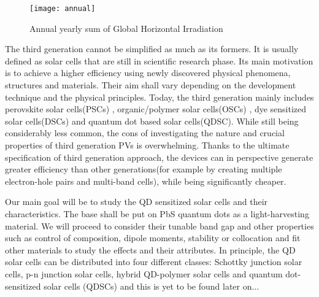 \begin{figure}[h]
\label{fig:annual} 
\centering
\texttt{[image: annual]}
\caption{Annual yearly sum of Global Horizontal Irradiation
\cite{1991-2010}}
\end{figure}

\noindent The third generation cannot be simplified as much as its formers. It is usually defined as solar cells that are still in scientific research phase.  \cite{HuashangRao2018}\cite{GavinCon} Its main motivation is to achieve a higher efficiency using newly discovered physical phenomena, structures and materials. Their aim shall vary depending on the development technique and the physical principles. Today, the third generation mainly includes perovskite solar cells(PSCs) \cite{PerovRev} \cite{revPerold}, organic/polymer solar cells(OSCs) \cite{Polymer}, dye sensitized solar cells(DSCs)\cite{DyeSent} and quantum dot based solar cells(QDSC). \cite{Kamat2018} While still being considerably less common, the cons of investigating the nature and crucial properties of third generation PVs is overwhelming. Thanks to the ultimate specification of third generation approach, the devices can in perspective generate greater efficiency than other generations(for example by creating multiple electron-hole pairs and multi-band cells), while being significantly cheaper.

\vline

\noindent Our main goal will be to study the QD sensitized solar cells and their characteristics. The base shall be put on PbS quantum dots as a light-harvesting material. We will proceed to consider their tunable band gap  and other properties such as control of composition, dipole moments, stability or collocation and fit other materials to study the effects and their attributes. In principle, the QD solar cells can be distributed into four different classes: Schottky junction solar cells, p-n junction solar cells, hybrid QD-polymer solar cells and quantum dot-sensitized solar cells (QDSCs) and this is yet to be found later on...